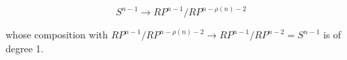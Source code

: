 $$S^{n-1} \rightarrow RP^{n-1}/RP^{n-\rho(n)-2}$$

whose composition with $RP^{n-1}/RP^{n-\rho(n)-2} \rightarrow RP^{n-1}/RP^{n-2} = S^{n-1}$ is of degree 1.
